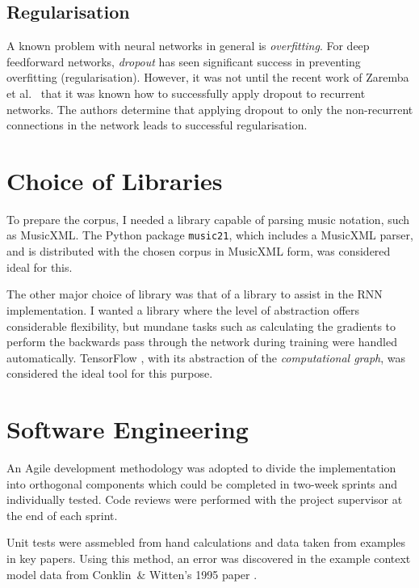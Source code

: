 \documentclass[12pt,a4paper,twoside,openright]{report}
\begin{document}
\subsection{Regularisation}

A known problem with neural networks in general is \emph{overfitting}. For deep
feedforward networks, \emph{dropout} \cite{srivastava2014dropout} has seen
significant success in preventing overfitting (regularisation). However, it was
not until the recent work of Zaremba et al.\ \cite{zaremba2014recurrent} that it
was known how to successfully apply dropout to recurrent networks. The authors
determine that applying dropout to only the non-recurrent connections in the
network leads to successful regularisation. 

\section{Choice of Libraries}

To prepare the corpus, I needed a library capable of parsing music notation,
such as MusicXML. The Python package \texttt{music21}, which includes a MusicXML
parser, and is distributed with the chosen corpus in MusicXML form, was
considered ideal for this. 

The other major choice of library was that of a library to assist in the RNN
implementation. I wanted a library where the level of abstraction offers
considerable flexibility, but mundane tasks such as calculating the gradients to
perform the backwards pass through the network during training were handled
automatically. TensorFlow \cite{abadi2016tensorflow}, with its abstraction of
the \emph{computational graph}, was considered the ideal tool for this purpose.

\section{Software Engineering}

An Agile development methodology was adopted to divide the implementation into
orthogonal components which could be completed in two-week sprints and
individually tested. Code reviews were performed with the project supervisor at
the end of each sprint. 

Unit tests were assmebled from hand calculations and data taken from examples in
key papers. Using this method, an error was discovered in the example context
model data from Conklin\ \& Witten's 1995 paper \cite{conklin1995viewpoints}.
\end{document}

